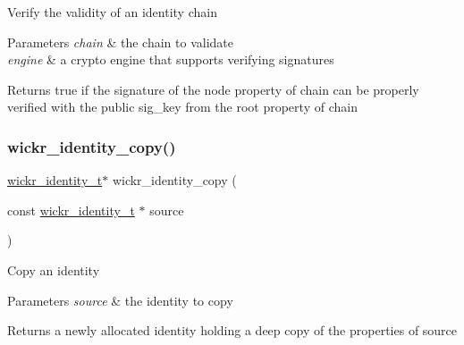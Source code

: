 Verify the validity of an identity chain


\begin{DoxyParams}{Parameters}
{\em chain} & the chain to validate \\
\hline
{\em engine} & a crypto engine that supports verifying signatures \\
\hline
\end{DoxyParams}
\begin{DoxyReturn}{Returns}
true if the \textquotesingle{}signature\textquotesingle{} of the \textquotesingle{}node\textquotesingle{} property of \textquotesingle{}chain\textquotesingle{} can be properly verified with the public \textquotesingle{}sig\+\_\+key\textquotesingle{} from the \textquotesingle{}root\textquotesingle{} property of \textquotesingle{}chain\textquotesingle{} 
\end{DoxyReturn}
\mbox{\label{group__wickr__identity_ga14d1fb3ddd1dbd7797eb9b628eef99fe}} 
\subsubsection{\texorpdfstring{wickr\_identity\_copy()}{wickr\_identity\_copy()}}
{\footnotesize\ttfamily \mbox{\hyperlink{structwickr__identity}{wickr\+\_\+identity\+\_\+t}}$\ast$ wickr\+\_\+identity\+\_\+copy (\begin{DoxyParamCaption}\item[{const \mbox{\hyperlink{structwickr__identity}{wickr\+\_\+identity\+\_\+t}} $\ast$}]{source }\end{DoxyParamCaption})}

Copy an identity


\begin{DoxyParams}{Parameters}
{\em source} & the identity to copy \\
\hline
\end{DoxyParams}
\begin{DoxyReturn}{Returns}
a newly allocated identity holding a deep copy of the properties of \textquotesingle{}source\textquotesingle{} 
\end{DoxyReturn}
\mbox{\label{group__wickr__identity_ga75bfef275a250a32784231e8c042913b}} 
